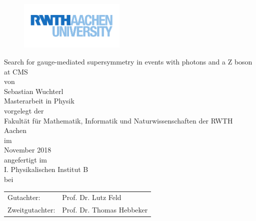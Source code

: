 \thispagestyle{empty}
\begin{figure}[th]
 \flushright
 \includegraphics[width=0.45\textwidth]{figures/rwth}
\end{figure}

\begin{center}
 \Huge
 Search for gauge-mediated supersymmetry in events with photons and a Z boson at CMS
 \\
 \vspace{1.5cm}
 \normalsize
 von\\
 \LARGE
 Sebastian Wuchterl\\
 \vspace{1.0cm}
 \Large
 Masterarbeit in Physik\\
 \vspace{1.5cm}
 \normalsize
 vorgelegt der \\
 \Large
 Fakult\"at f\"ur Mathematik, Informatik und Naturwissenschaften der RWTH Aachen\\
 \vspace{1.5cm}
 \normalsize
 im\\
 \Large
 November 2018\\
 \vspace{1.5cm}
 \normalsize
 angefertigt im\\
 \Large
 I. Physikalischen Institut B\\
 \vspace{1.5cm}
 \normalsize
 bei\par
 \begin{tabular}{ll}
  \Large
  Gutachter:             & \Large Prof. Dr. Lutz Feld       \\
  \Large Zweitgutachter: & \Large Prof. Dr. Thomas Hebbeker 
 \end{tabular}
\end{center}
\thispagestyle{empty}
\restoregeometry
\newpage
